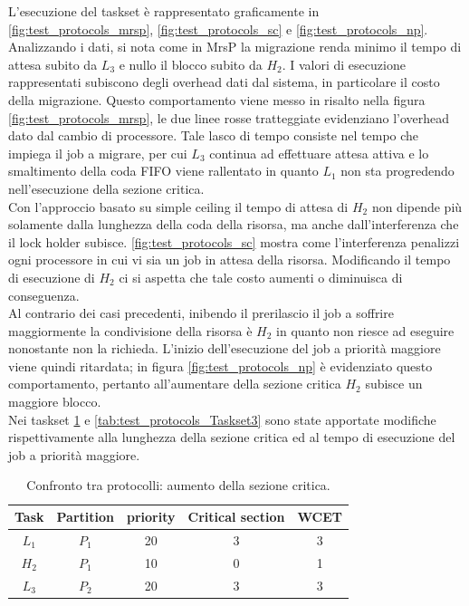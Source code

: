 {\noindent L'esecuzione del taskset è rappresentato graficamente in \ref{fig:test_protocols_mrsp}, \ref{fig:test_protocols_sc} e \ref{fig:test_protocols_np}. Analizzando i dati, si nota come in MrsP la migrazione renda minimo il tempo di attesa subito da $L_3$ e nullo il blocco subito da $H_2$. I valori di esecuzione rappresentati subiscono degli overhead dati dal sistema, in particolare il costo della migrazione. Questo comportamento viene messo in risalto nella figura \ref{fig:test_protocols_mrsp}, le due linee rosse tratteggiate evidenziano l'overhead dato dal cambio di processore. Tale lasco di tempo consiste nel tempo che impiega il job a migrare, per cui $L_3$ continua ad effettuare attesa attiva e lo smaltimento della coda FIFO viene rallentato in quanto $L_1$ non sta progredendo nell'esecuzione della sezione critica.\\
Con l'approccio basato su simple ceiling il tempo di attesa di $H_2$ non dipende più solamente dalla lunghezza della coda della risorsa, ma anche dall'interferenza che il lock holder subisce. \ref{fig:test_protocols_sc} mostra come l'interferenza penalizzi ogni processore in cui vi sia un job in attesa della risorsa. Modificando il tempo di esecuzione di $H_2$ ci si aspetta che tale costo aumenti o diminuisca di conseguenza.\\
Al contrario dei casi precedenti, inibendo il prerilascio il job a soffrire maggiormente la condivisione della risorsa è $H_2$ in quanto non riesce ad eseguire nonostante non la richieda. L'inizio dell'esecuzione del job a priorità maggiore viene quindi ritardata; in figura \ref{fig:test_protocols_np} è evidenziato questo comportamento, pertanto all'aumentare della sezione critica $H_2$ subisce un maggiore blocco.\\

\noindent Nei taskset  \ref{tab:test_protocols_Taskset2} e \ref{tab:test_protocols_Taskset3} sono state apportate modifiche rispettivamente alla lunghezza della sezione critica ed al tempo di esecuzione del job a priorità maggiore.\\

\begin{table}
  \centering
  \begin{tabular}{ccccc}
  \hline\hline
    Task & Partition     & priority & Critical section & WCET  \\ \hline
    $L_1$ & $P_1$  & 20 & 3 & 3 \\
    $H_2$ & $P_1$  & 10 & 0 & 1 \\
    $L_3$ & $P_2$  & 20 & 3 & 3 \\
    \hline
    \end{tabular}
  \caption{Confronto tra protocolli: aumento della sezione critica.}
  \label{tab:test_protocols_Taskset2}
  \end{table}

}

